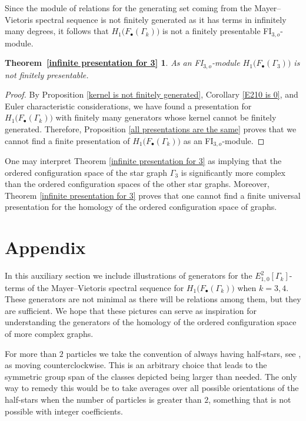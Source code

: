 \documentclass[pagebackref,colorlinks,citecolor=blue,linkcolor=blue,urlcolor=blue,filecolor=blue]{article}
\newtheorem*{T3}{Theorem~\ref{infinite presentation for 3}}
\theoremstyle{definition}\newtheorem{definition}[thm]{Definition}
\theoremstyle{definition}
\newcommand{\thmtexttwo}{As an FI$_{3, o}$-module $H_{1}\big(F_{\bullet}(\Gamma_{3})\big)$ is not finitely presentable.}
\begin{document}
Since the module of relations for the generating set coming from the Mayer--Vietoris spectral sequence is not finitely generated as it has terms in infinitely many degrees, it follows that $H_{1}\big(F_{\bullet}(\Gamma_{k})\big)$ is not a finitely presentable FI$_{3,o}$-module.

\begin{T3}
  \thmtexttwo
\end{T3}

\begin{proof}
By Proposition \ref{kernel is not finitely generated}, Corollary \ref{E210 is 0}, and Euler characteristic considerations, we have found a presentation for $H_{1}\big(F_{\bullet}(\Gamma_{k})\big)$ with finitely many generators whose kernel cannot be finitely generated. 
Therefore, Proposition \ref{all presentations are the same} proves that we cannot find a finite presentation of $H_{1}\big(F_{\bullet}(\Gamma_{k})\big)$ as an FI$_{3,o}$-module.
\end{proof}

One may interpret Theorem \ref{infinite presentation for 3} as implying that the ordered configuration space of the star graph $\Gamma_{3}$ is significantly more complex than the ordered configuration spaces of the other star graphs.
Moreover, Theorem \ref{infinite presentation for 3} proves that one cannot find a finite universal presentation for the homology of the ordered configuration space of graphs.

\section{Appendix}\label{appendix}

In this auxiliary section we include illustrations of generators for the $E^{2}_{1,0}[\Gamma_{k}]$-terms of the Mayer--Vietoris spectral sequence for $H_{1}\big(F_{\bullet}(\Gamma_{k})\big)$ when $k=3,4$.
These generators are not minimal as there will be relations among them, but they are sufficient.
We hope that these pictures can serve as inspiration for understanding the generators of the homology of the ordered configuration space of more complex graphs.

For more than $2$ particles we take the convention of always having half-stars, see \cite{an2020edge, an2022asymptotic}, as moving counterclockwise.
This is an arbitrary choice that leads to the symmetric group span of the classes depicted being larger than needed. 
The only way to remedy this would be to take averages over all possible orientations of the half-stars when the number of particles is greater than $2$, something that is not possible with integer coefficients.
\end{document}
